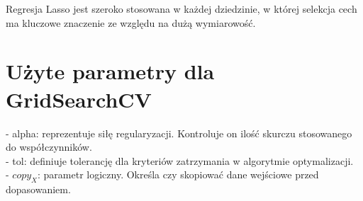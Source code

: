 Regresja Lasso jest szeroko stosowana w każdej dziedzinie, w której selekcja cech ma kluczowe znaczenie ze względu na dużą wymiarowość.
\clearpage

{}
\section*{Użyte parametry dla GridSearchCV \cite{url_Lasso, url_grid_search}}
\vspace{-1.0em}


- alpha: reprezentuje siłę regularyzacji. Kontroluje on ilość skurczu stosowanego do współczynników.\\
- tol: definiuje tolerancję dla kryteriów zatrzymania w algorytmie optymalizacji.\\
- $copy_X$: parametr logiczny. Określa czy skopiować dane wejściowe przed dopasowaniem. \\

\noindent\makebox[\linewidth]{\rule{\paperwidth}{0.4pt}}